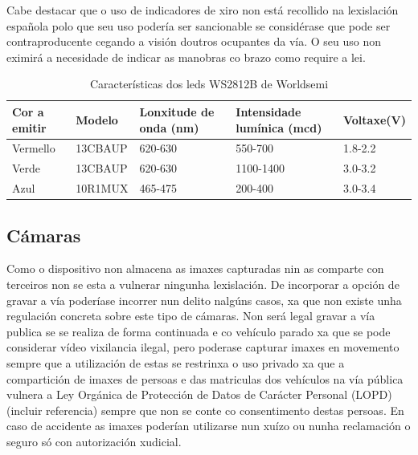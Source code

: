 Cabe destacar que o uso de indicadores de xiro non está recollido na lexislación española polo que seu uso podería ser sancionable se considérase que  pode ser contraproducente cegando a visión doutros ocupantes da vía. O seu uso non eximirá a necesidade de indicar as manobras co brazo como require a lei.
\begin{table}[tb]
    \label{c:intensidade leds}
    \begin{center}
        \begin{tabular}{|l|l|l|l|l|}
            \hline
             Cor a emitir & Modelo & Lonxitude de onda (nm) & Intensidade lumínica (mcd)&Voltaxe(V)\\ \hline
             Vermello & 13CBAUP & 620-630 & 550-700 & 1.8-2.2\\ \hline
             Verde & 13CBAUP & 620-630 & 1100-1400 & 3.0-3.2\\ \hline
             Azul & 10R1MUX & 465-475 & 200-400 & 3.0-3.4\\ \hline
        \end{tabular}
    \end{center}
    \caption{Características dos leds WS2812B de Worldsemi}
\end{table}

\subsection{Cámaras}

Como o dispositivo non almacena as imaxes capturadas nin as comparte con terceiros non se esta a vulnerar ningunha lexislación. De incorporar a opción de gravar a vía poderíase incorrer nun delito nalgúns casos, xa que non existe unha regulación concreta sobre este tipo de cámaras.
 Non será legal gravar a vía publica se se realiza de forma continuada e co vehículo parado xa que se pode considerar vídeo vixilancia ilegal, pero poderase capturar imaxes en movemento sempre que a utilización de estas se restrinxa o uso privado xa que a compartición de imaxes de persoas e das matriculas dos vehículos na vía pública vulnera a Ley Orgánica de Protección de Datos de Carácter Personal (LOPD) (incluir referencia) sempre que non se conte co consentimento destas persoas. En caso de accidente as imaxes poderían utilizarse nun xuízo ou nunha reclamación o seguro só con autorización xudicial.
